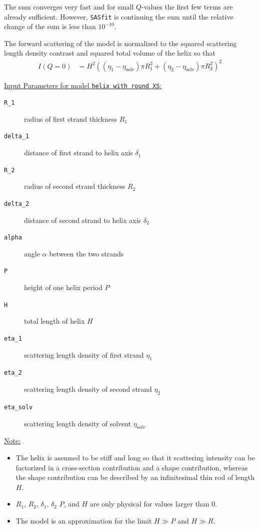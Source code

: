 The sum converges very fast and for small $Q$-values the first few terms are already sufficient. However, {\tt SASfit} is continuing the sum until the relative change of the sum is less than $10^{-10}$.

The forward scattering of the model is normalized to the squared scattering length density contrast and squared total volume of the helix so that
\begin{align}
I(Q=0) &= H^2\left(\left(\eta_\text{1}-\eta_\text{solv}\right)\pi R_1^2+\left(\eta_\text{2}-\eta_\text{solv}\right)\pi R_2^2\right)^2
\end{align}

\vspace{5mm}

\uline{Input Parameters for model \texttt{helix with round XS}:}\\
\begin{description}
\item[\texttt{R\_1}] radius of first strand thickness $R_1$
\item[\texttt{delta\_1}] distance of first strand to helix axis $\delta_1$
\item[\texttt{R\_2}] radius of second strand thickness $R_2$
\item[\texttt{delta\_2}] distance of second strand to helix axis $\delta_2$
\item[\texttt{alpha}] angle $\alpha$ between the two strands
\item[\texttt{P}] height of one helix period $P$
\item[\texttt{H}] total length of helix $H$
\item[\texttt{eta\_1}] scattering length density of first strand $\eta_1$
\item[\texttt{eta\_2}] scattering length density of second strand $\eta_2$
\item[\texttt{eta\_solv}] scattering length density of solvent $\eta_\text{solv}$
\end{description}

\noindent\uline{Note:}
\begin{itemize}
\item The helix is assumed to be stiff and long so that it scattering intensity can be factorized in a cross-section contribution and a shape contribution, whereas the shape contribution can be described by an infinitesimal thin rod of length $H$.
\item $R_1$, $R_2$, $\delta_1$, $\delta_2$ $P$, and $H$ are only physical for values larger than 0.
\item The model is an approximation for the limit $H \gg P$ and $H \gg R$.
\end{itemize}

